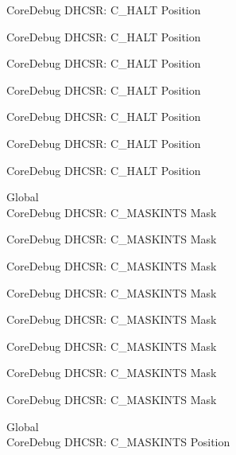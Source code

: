\begin{DoxyRefList}
\label{deprecated__deprecated000125}%
%
Core\+Debug DHCSR\+: C\+\_\+\+HALT Position 

\label{deprecated__deprecated000181}%
%
Core\+Debug DHCSR\+: C\+\_\+\+HALT Position 

\label{deprecated__deprecated000264}%
%
Core\+Debug DHCSR\+: C\+\_\+\+HALT Position 

\label{deprecated__deprecated000323}%
%
Core\+Debug DHCSR\+: C\+\_\+\+HALT Position 

\label{deprecated__deprecated000399}%
%
Core\+Debug DHCSR\+: C\+\_\+\+HALT Position 

\label{deprecated__deprecated000488}%
%
Core\+Debug DHCSR\+: C\+\_\+\+HALT Position 

\label{deprecated__deprecated000590}%
%
Core\+Debug DHCSR\+: C\+\_\+\+HALT Position  
\item[Global \doxylink{group___c_m_s_i_s___core_debug_ga77fe1ef3c4a729c1c82fb62a94a51c31}{Core\+Debug\+\_\+\+DHCSR\+\_\+\+C\+\_\+\+MASKINTS\+\_\+\+Msk} ]\hfill \\
\label{deprecated__deprecated000034}%
%
Core\+Debug DHCSR\+: C\+\_\+\+MASKINTS Mask 

\label{deprecated__deprecated000122}%
%
Core\+Debug DHCSR\+: C\+\_\+\+MASKINTS Mask 

\label{deprecated__deprecated000178}%
%
Core\+Debug DHCSR\+: C\+\_\+\+MASKINTS Mask 

\label{deprecated__deprecated000261}%
%
Core\+Debug DHCSR\+: C\+\_\+\+MASKINTS Mask 

\label{deprecated__deprecated000320}%
%
Core\+Debug DHCSR\+: C\+\_\+\+MASKINTS Mask 

\label{deprecated__deprecated000396}%
%
Core\+Debug DHCSR\+: C\+\_\+\+MASKINTS Mask 

\label{deprecated__deprecated000485}%
%
Core\+Debug DHCSR\+: C\+\_\+\+MASKINTS Mask 

\label{deprecated__deprecated000587}%
%
Core\+Debug DHCSR\+: C\+\_\+\+MASKINTS Mask  
\item[Global \doxylink{group___c_m_s_i_s___core_debug_ga0d2907400eb948a4ea3886ca083ec8e3}{Core\+Debug\+\_\+\+DHCSR\+\_\+\+C\+\_\+\+MASKINTS\+\_\+\+Pos} ]\hfill \\
\label{deprecated__deprecated000033}%
%
Core\+Debug DHCSR\+: C\+\_\+\+MASKINTS Position 


\end{DoxyRefList}
